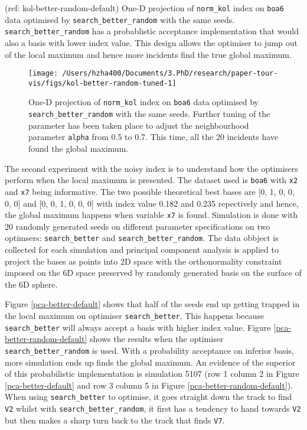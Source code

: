\documentclass[12pt]{article}
\begin{document}
(ref: kol-better-random-default) One-D projection of \texttt{norm\_kol} index on \texttt{boa6} data optimised by \texttt{search\_better\_random} with the same seeds. \texttt{search\_better\_random} has a probablistic acceptance implementation that would also a basis with lower index value. This design allows the optimiser to jump out of the local maximum and hence more incidents find the true global maximum.

\begin{figure}

{\centering \texttt{[image: /Users/hzha400/Documents/3.PhD/research/paper-tour-vis/figs/kol-better-random-tuned-1]} 

}

\caption{One-D projection of \texttt{norm\_kol} index on \texttt{boa6} data optimised by \texttt{search\_better\_random} with the same seeds. Further tuning of the parameter has been taken place to adjust the neighbourhood parameter \texttt{alpha} from 0.5 to 0.7. This time, all the 20 incidents have found the global maximum.}\label{fig:kol-better-random-tuned}
\end{figure}



The second experiment with the noisy index is to understand how the optimisers perform when the local maximum is presented. The dataset used is \texttt{boa6} with \texttt{x2} and \texttt{x7} being informative. The two possible theoretical best bases are {[}0, 1, 0, 0, 0, 0{]} and {[}0, 0, 1, 0, 0, 0{]} with index value 0.182 and 0.235 repectively and hence, the global maximum happens when variable \texttt{x7} is found. Simulation is done with 20 randomly generated seeds on different parameter specifications on two optimsers: \texttt{search\_better} and \texttt{search\_better\_random}. The data obbject is collected for each simulation and principal component analysis is applied to project the bases as points into 2D space with the orthonormality constraint imposed on the 6D space preserved by randomly generated basis on the surface of the 6D sphere.

Figure \ref{pca-better-default} shows that half of the seeds end up getting trapped in the local maximum on optimiser \texttt{search\_better}. This happens because \texttt{search\_better} will always accept a basis with higher index value. Figure \ref{pca-better-random-default} shows the results when the optimiser \texttt{search\_better\_random} is used. With a probability acceptance on inferior basis, more simulation ends up finds the global maximum. An evidence of the superior of this probabilistic implementation is simulation 5107 (row 1 column 2 in Figure \ref{pca-better-default} and row 3 column 5 in Figure \ref{pca-better-random-default}). When using \texttt{search\_better} to optimise, it goes straight down the track to find \texttt{V2} whilst with \texttt{search\_better\_random}, it first has a tendency to hand towards \texttt{V2} but then makes a sharp turn back to the track that finds \texttt{V7}.
\end{document}
